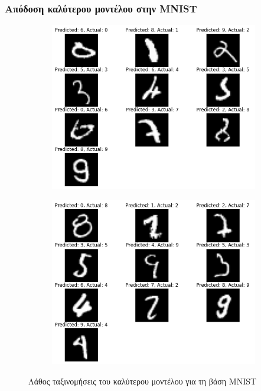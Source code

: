 \documentclass{beamer}
\begin{document}
\begin{frame}
\frametitle{Απόδοση καλύτερου μοντέλου στην MNIST}

\begin{figure}[H]
    \centering

    \begin{subfigure}[t]{0.48\linewidth}
    \includegraphics[width=\linewidth]{figures/mnist/wrong_results_1.png}
    \end{subfigure}
    \begin{subfigure}[t]{0.48\linewidth}
    \includegraphics[width=\linewidth]{figures/mnist/wrong_results_2.png}
    \end{subfigure}

    \caption{Λάθος ταξινομήσεις του καλύτερου μοντέλου για τη βάση MNIST}
    \label{fig:mnist_wrong}
\end{figure}

\end{frame}
\end{document}
